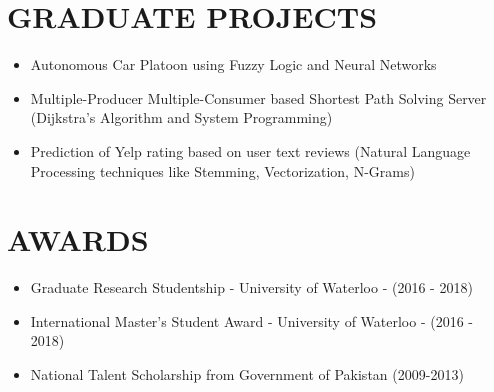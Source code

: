 \documentclass[margin, 10pt]{res} %
\begin{document}
\begin{resume}

\section{GRADUATE PROJECTS}

\begin{itemize} \itemsep -2pt %
\item Autonomous Car Platoon using Fuzzy Logic and Neural Networks
\item Multiple-Producer Multiple-Consumer based Shortest Path Solving Server (Dijkstra's Algorithm and System Programming)
\item Prediction of Yelp rating based on user text reviews (Natural Language Processing techniques like Stemming, Vectorization, N-Grams)
\end{itemize}

\section{AWARDS} 

\begin{itemize} \itemsep -2pt %
\item Graduate Research Studentship - University of Waterloo - (2016 - 2018)
\item International Master's Student Award - University of Waterloo - (2016 - 2018)
\item National Talent Scholarship from Government of Pakistan (2009-2013)
\end{itemize}


\end{resume}
\end{document}

